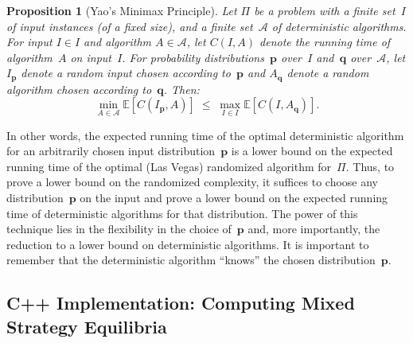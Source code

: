 \documentclass[twoside,12pt]{book}
\theoremstyle{plain}
\newtheorem{proposition}[theorem]{Proposition}
\theoremstyle{definition}
\theoremstyle{remark}
\begin{document}
\begin{proposition}[Yao's Minimax Principle]
\label{prop:yao}
Let $\Pi$ be a problem with a finite set~$I$ of input instances (of a fixed
size), and a finite set~$\mathcal{A}$ of deterministic algorithms.  For input
$I\in I$ and algorithm $A\in\mathcal{A}$, let $C(I,A)$ denote the running
time of algorithm~$A$ on input~$I$.  For probability distributions~$\mathbf{p}$
over~$I$ and~$\mathbf{q}$ over~$\mathcal{A}$, let $I_{\mathbf{p}}$ denote a
random input chosen according to~$\mathbf{p}$ and $A_{\mathbf{q}}$ denote a
random algorithm chosen according to~$\mathbf{q}$.  Then:
\[
  \min_{A\in\mathcal{A}} \mathbb{E}[C(I_{\mathbf{p}}, A)]
  \;\le\;
  \max_{I\in I} \mathbb{E}[C(I, A_{\mathbf{q}})].
\]
\end{proposition}

In other words, the expected running time of the optimal deterministic
algorithm for an arbitrarily chosen input distribution~$\mathbf{p}$ is a
lower bound on the expected running time of the optimal (Las Vegas)
randomized algorithm for~$\Pi$.  Thus, to prove a lower bound on the
randomized complexity, it suffices to choose any distribution~$\mathbf{p}$ on
the input and prove a lower bound on the expected running time of
deterministic algorithms for that distribution.  The power of this technique
lies in the flexibility in the choice of~$\mathbf{p}$ and, more importantly,
the reduction to a lower bound on deterministic algorithms.  It is important
to remember that the deterministic algorithm ``knows'' the chosen
distribution~$\mathbf{p}$.

\subsection{C++ Implementation: Computing Mixed Strategy Equilibria}
\end{document}
